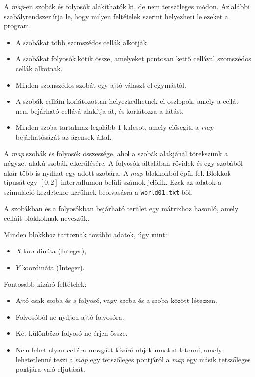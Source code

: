 
A \textit{map}-en szobák és folyosók alakíthatók ki, de nem tetszőleges módon. Az alábbi szabályrendszer írja le, hogy milyen feltételek szerint helyezheti le ezeket a program.
\begin{itemize}
\item A szobákat több szomszédos cellák alkotják.
\item A szobákat folyosók kötik össze, amelyeket pontosan kettő cellával szomszédos cellák alkotnak.
\item Minden szomszédos szobát egy ajtó választ el egymástól.
\item A szobák celláin korlátozottan helyezkedhetnek el oszlopok, amely a cellát nem bejárható cellává alakítja át, és korlátozza a látást.
\item Minden szoba tartalmaz legalább 1 kulcsot, amely elősegíti a \textit{map} bejárhatóságát az ágensek által.
\end{itemize}


A \textit{map} szobák és folyosók összessége, ahol a szobák alakjánál törekszünk a négyzet alakú szobák elkerülésére. A folyosók általában rövidek és egy szobából akár több is nyílhat egy adott szobára.
A \textit{map} blokkokból épül fel. Blokkok típusát egy $[0, 2]$ intervallumon belüli számok jelölik.
Ezek az adatok a szimuláció kezdetekor kerülnek beolvasásra a \texttt{world01.txt}-ből.

A szobákban és a folyosókban bejárható terület egy mátrixhoz hasonló, amely celláit blokkoknak nevezzük.

Minden blokkhoz tartoznak további adatok, úgy mint:
\begin{itemize}
    \item $X$ koordináta (Integer),
    \item $Y$ koordináta (Integer).
\end{itemize}

\noindent Fontosabb kizáró feltételek:
\begin{itemize}
    \item Ajtó csak szoba és a folyosó, vagy szoba és a szoba között létezzen.
    \item Folyosóból ne nyíljon ajtó folyosóra.
    \item Két különböző folyosó ne érjen össze.
    \item Nem lehet olyan cellára mozgást kizáró objektumokat letenni, amely lehetetlenné teszi a \textit{map} egy tetszőleges pontjáról a \textit{map} egy másik tetszőleges pontjára való eljutását.
\end{itemize}

